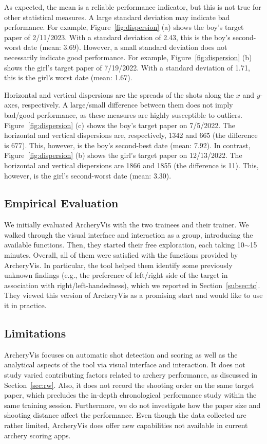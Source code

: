 \documentclass[runningheads]{llncs}
\begin{document}
As expected, the mean is a reliable performance indicator, but this is not true for other statistical measures. 
%
A large standard deviation may indicate bad performance. 
For example, Figure~\ref{fig:dispersion} (a) shows the boy's target paper of 2/11/2023. 
With a standard deviation of 2.43, this is the boy's second-worst date (mean: 3.69).
However, a small standard deviation does not necessarily indicate good performance. 
For example, Figure~\ref{fig:dispersion} (b) shows the girl's target paper of 7/19/2022. 
With a standard deviation of 1.71, this is the girl's worst date (mean: 1.67).

Horizontal and vertical dispersions are the spreads of the shots along the $x$ and $y$-axes, respectively. 
A large/small difference between them does not imply bad/good performance, as these measures are highly susceptible to outliers. 
Figure~\ref{fig:dispersion} (c) shows the boy's target paper on 7/5/2022. The horizontal and vertical dispersions are, respectively, 1342 and 665 (the difference is 677). This, however, is the boy's second-best date (mean: 7.92). 
In contrast, Figure~\ref{fig:dispersion} (b) shows the girl's target paper on 12/13/2022. The horizontal and vertical dispersions are 1866 and 1855 (the difference is 11). This, however, is the girl's second-worst date (mean: 3.30).

\subsection{Empirical Evaluation}

We initially evaluated ArcheryVis with the two trainees and their trainer. 
We walked through the visual interface and interaction as a group, introducing the available functions. 
Then, they started their free exploration, each taking 10$\sim$15 minutes.
Overall, all of them were satisfied with the functions provided by ArcheryVis. 
In particular, the tool helped them identify some previously unknown findings (e.g., the preference of left/right side of the target in association with right/left-handedness), which we reported in Section~\ref{subsec:tc}. 
They viewed this version of ArcheryVis as a promising start and would like to use it in practice. 

\subsection{Limitations}

ArcheryVis focuses on automatic shot detection and scoring as well as the analytical aspects of the tool via visual interface and interaction. 
It does not study varied contributing factors related to archery performance, as discussed in Section~\ref{sec:rw}. 
Also, it does not record the shooting order on the same target paper, which precludes the in-depth chronological performance study within the same training session. 
Furthermore, we do not investigate how the paper size and shooting distance 
affect the performance. 
Even though the data collected are rather limited, ArcheryVis does offer new capabilities not available in current archery scoring apps. 
\end{document}
